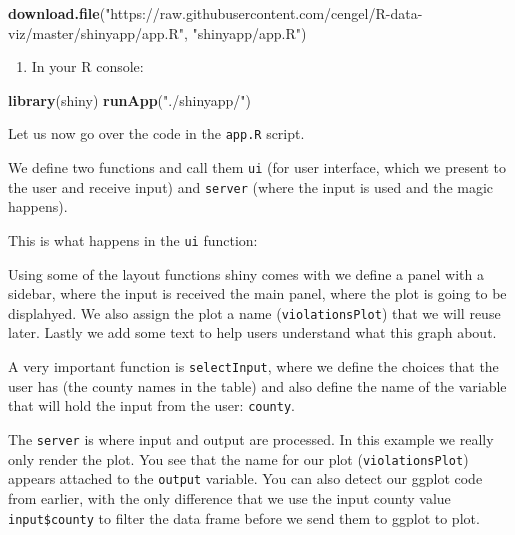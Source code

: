 \documentclass[]{book}
\newenvironment{Shaded}{\begin{snugshade}}{\end{snugshade}}
\newcommand{\KeywordTok}[1]{\textcolor[rgb]{0.13,0.29,0.53}{\textbf{#1}}}
\newcommand{\NormalTok}[1]{#1}
\newcommand{\StringTok}[1]{\textcolor[rgb]{0.31,0.60,0.02}{#1}}
\providecommand{\tightlist}{%
  \setlength{\itemsep}{0pt}\setlength{\parskip}{0pt}}
\begin{document}
\begin{Shaded}
\begin{Highlighting}[]
\KeywordTok{download.file}\NormalTok{(}\StringTok{"https://raw.githubusercontent.com/cengel/R-data-viz/master/shinyapp/app.R"}\NormalTok{, }\StringTok{"shinyapp/app.R"}\NormalTok{)}
\end{Highlighting}
\end{Shaded}

\begin{enumerate}
\def\labelenumi{\arabic{enumi}.}
\setcounter{enumi}{3}
\tightlist
\item
  In your R console:
\end{enumerate}

\begin{Shaded}
\begin{Highlighting}[]
\KeywordTok{library}\NormalTok{(shiny)}
\KeywordTok{runApp}\NormalTok{(}\StringTok{"./shinyapp/"}\NormalTok{)}
\end{Highlighting}
\end{Shaded}

Let us now go over the code in the \texttt{app.R} script.

We define two functions and call them \texttt{ui} (for user interface, which we present to the user and receive input) and \texttt{server} (where the input is used and the magic happens).

This is what happens in the \texttt{ui} function:

Using some of the layout functions shiny comes with we define a panel with a sidebar, where the input is received the main panel, where the plot is going to be displahyed. We also assign the plot a name (\texttt{violationsPlot}) that we will reuse later. Lastly we add some text to help users understand what this graph about.

A very important function is \texttt{selectInput}, where we define the choices that the user has (the county names in the table) and also define the name of the variable that will hold the input from the user: \texttt{county}.

The \texttt{server} is where input and output are processed. In this example we really only render the plot. You see that the name for our plot (\texttt{violationsPlot}) appears attached to the \texttt{output} variable. You can also detect our ggplot code from earlier, with the only difference that we use the input county value \texttt{input\$county} to filter the data frame before we send them to ggplot to plot.
\end{document}
